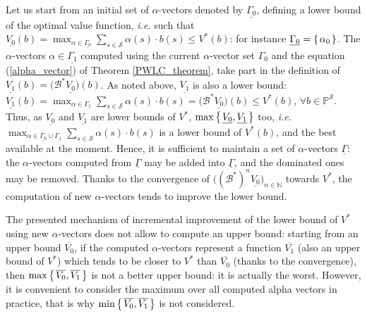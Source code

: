 Let us start from an initial set of $\alpha$-vectors 
denoted by $\underline{\Gamma_0}$, defining a lower bound of the optimal value function,
\textit{i.e.} such that $\underline{V_0}(b) 
= \max_{\alpha \in \underline{\Gamma_0}} \sum_{s \in \mathcal{S}} \alpha(s) \cdot b(s) \leqslant V^*(b)$: 
for instance $\underline{\Gamma_0} = \left\{ \left.  \alpha_0  \right. \right\}$. 
The $\alpha$-vectors $\alpha \in \underline{\Gamma_1}$ computed using the 
current $\alpha$-vector set $\Gamma_0$
and the equation (\ref{alpha_vector}) of Theorem \ref{PWLC_theorem},
take part in the definition of $\underline{V_1}(b) = \Big( \mathcal{B}^* \underline{V_0} \Big)(b)$.
As noted above, $\underline{V_1}$ is also a lower bound: $\underline{V_1}(b) 
= \max_{\alpha \in \underline{\Gamma_1}} \sum_{s \in \mathcal{S}} \alpha(s) \cdot b(s) 
= \Big( \mathcal{B}^* \underline{V_0} \Big) (b) \leqslant V^*(b)$, 
$\forall b \in \mathbb{P}^{\mathcal{S}}$.
Thus, as $\underline{V_0}$ and $\underline{V_1}$
are lower bounds of $V^*$, $\max \left\{ \left. \underline{V_0}, \underline{V_1} \right. \right\}$ too,
\textit{i.e.} $\max_{\alpha \in \underline{\Gamma_0} \cup \underline{\Gamma_1}} \sum_{s \in \mathcal{S}} \alpha(s) \cdot b(s)$
is a lower bound of $V^*(b)$, and the best available at the moment.
Hence, it is sufficient to maintain a set of $\alpha$-vectors $\underline{\Gamma}$:
the $\alpha$-vectors computed from $\underline{\Gamma}$ may be added into $\underline{\Gamma}$, 
and the dominated ones may be removed.
Thanks to the convergence of $\Big( (\mathcal{B}^*)^n \underline{V_0} \Big)_{n \in \mathbb{N}}$ towards $V^*$, 
the computation of new $\alpha$-vectors tends to improve the lower bound.

The presented mechanism of incremental improvement
of the lower bound of $V^*$
using new $\alpha$-vectors 
does not allow to compute an upper bound:
starting from an upper bound $\overline{V_0}$,
if the computed $\alpha$-vectors represent
a function $\overline{V_1}$ (also an upper bound of $V^*$)
which tends to be closer to $V^*$ than $\overline{V_0}$ (thanks to the convergence), 
then $\max \left\{ \left.  \overline{V_0}, \overline{V_1}   \right. \right\}$
is not a better upper bound: it is actually the worst.
However, it is convenient to consider the maximum
over all computed alpha vectors in practice,
that is why $\min \left\{ \left.  \overline{V_0}, \overline{V_1}  \right. \right\}$
is not considered.

